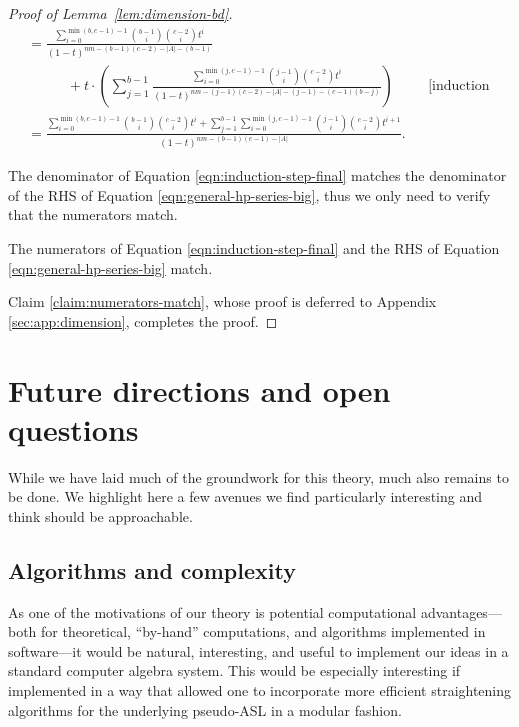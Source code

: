\documentclass[11pt,reqno]{amsart}
\newcommand*{\eqcommentnear}[1]{&&\text{[#1]}}
\theoremstyle{definition}
\numberwithin{equation}{section}
\begin{document}
\begin{proof}[Proof of Lemma~\ref{lem:dimension-bd}]
\begin{align}
&\,= \frac{\sum_{i=0}^{\min(b, c-1) - 1} \binom{b-1}{i}\binom{c-2}{i} t^i}{(1 - t)^{nm - (b-1)(c-2) - |A| - (b-1)}} \nonumber \\
&\qquad \quad + t\cdot \left(\sum_{j=1}^{b-1} \frac{\sum_{i=0}^{\min(j, c-1) - 1} \binom{j-1}{i}\binom{c-2}{i} t^i}{(1 - t)^{nm - (j-1)(c-2) - |A|-(j-1)-(c-1)(b-j)}}\right) \eqcommentnear{induction hypothesis} \nonumber \\
&\,= \frac{\sum_{i=0}^{\min(b, c-1) - 1} \binom{b-1}{i}\binom{c-2}{i} t^i + \sum_{j=1}^{b-1} \sum_{i=0}^{\min(j, c-1) - 1} \binom{j-1}{i}\binom{c-2}{i} t^{i+1}}{(1 - t)^{nm - (b-1)(c-1) - |A|}}. \label{eqn:induction-step-final}
\end{align}

The denominator of Equation \eqref{eqn:induction-step-final} matches the denominator of the RHS of Equation \eqref{eqn:general-hp-series-big}, thus we only need to verify that the numerators match. 
\begin{claim}[store=claimnumeratorsmatch] 
\label{claim:numerators-match} 
The numerators of Equation \eqref{eqn:induction-step-final} and the RHS of Equation \eqref{eqn:general-hp-series-big} match.
\end{claim}

Claim \ref{claim:numerators-match}, whose proof is deferred to Appendix \ref{sec:app:dimension}, completes the proof.
\end{proof}



\section{Future directions and open questions}
While we have laid much of the groundwork for this theory, much also remains to be done. We highlight here a few avenues we find particularly interesting and think should be approachable.

\subsection{Algorithms and complexity}
As one of the motivations of our theory is potential computational advantages---both for theoretical, ``by-hand'' computations, and algorithms implemented in software---it would be natural, interesting, and useful to implement our ideas in a standard computer algebra system. This would be especially interesting if implemented in a way that allowed one to incorporate more efficient straightening algorithms for the underlying pseudo-ASL in a modular fashion.
\end{document}
